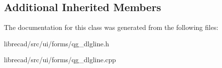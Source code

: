 \subsection*{Additional Inherited Members}


The documentation for this class was generated from the following files\-:\begin{DoxyCompactItemize}
\item 
librecad/src/ui/forms/qg\-\_\-dlgline.\-h\item 
librecad/src/ui/forms/qg\-\_\-dlgline.\-cpp\end{DoxyCompactItemize}
